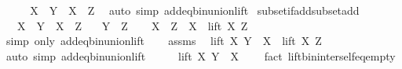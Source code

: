 \begin{isabellebody}
\ \ \isamarkupfalse%
\ \isamarkupfalse%
\ {\isachardoublequoteopen}X\ {\isacharplus}{\kern0pt}\ Y\ {\isasymsubseteq}\ X\ {\isacharplus}{\kern0pt}\ Z{\isachardoublequoteclose}\ \isamarkupfalse%
\ {\isacharparenleft}{\kern0pt}auto\ simp{\isacharcolon}{\kern0pt}\ add{\isacharunderscore}{\kern0pt}eq{\isacharunderscore}{\kern0pt}bin{\isacharunderscore}{\kern0pt}union{\isacharunderscore}{\kern0pt}lift{\isacharparenright}{\kern0pt}\isanewline
{}\isamarkupfalse%
%
\endisatagproof
{\isafoldproof}%
%
\isadelimproof
\isanewline
%
\endisadelimproof
\isanewline
{}\isamarkupfalse%
\ subset{\isacharunderscore}{\kern0pt}if{\isacharunderscore}{\kern0pt}add{\isacharunderscore}{\kern0pt}subset{\isacharunderscore}{\kern0pt}add{\isacharcolon}{\kern0pt}\isanewline
\ \ \ {\isachardoublequoteopen}X\ {\isacharplus}{\kern0pt}\ Y\ {\isasymsubseteq}\ X\ {\isacharplus}{\kern0pt}\ Z{\isachardoublequoteclose}\isanewline
\ \ \ {\isachardoublequoteopen}Y\ {\isasymsubseteq}\ Z{\isachardoublequoteclose}\isanewline
%
\isadelimproof
%
\endisadelimproof
%
\isatagproof
{}\isamarkupfalse%
{\isacharminus}{\kern0pt}\isanewline
\ \ \isamarkupfalse%
\ {\isachardoublequoteopen}X\ {\isacharplus}{\kern0pt}\ Z\ {\isacharequal}{\kern0pt}\ X\ {\isasymunion}\ lift\ X\ Z{\isachardoublequoteclose}\ \isamarkupfalse%
\ {\isacharparenleft}{\kern0pt}simp\ only{\isacharcolon}{\kern0pt}\ add{\isacharunderscore}{\kern0pt}eq{\isacharunderscore}{\kern0pt}bin{\isacharunderscore}{\kern0pt}union{\isacharunderscore}{\kern0pt}lift{\isacharparenright}{\kern0pt}\isanewline
\ \ \isamarkupfalse%
\ assms\ \isamarkupfalse%
\ {\isachardoublequoteopen}lift\ X\ Y\ {\isasymsubseteq}\ X\ {\isasymunion}\ lift\ X\ Z{\isachardoublequoteclose}\ \isamarkupfalse%
\ {\isacharparenleft}{\kern0pt}auto\ simp{\isacharcolon}{\kern0pt}\ add{\isacharunderscore}{\kern0pt}eq{\isacharunderscore}{\kern0pt}bin{\isacharunderscore}{\kern0pt}union{\isacharunderscore}{\kern0pt}lift{\isacharparenright}{\kern0pt}\isanewline
\ \ \isamarkupfalse%
\ \isamarkupfalse%
\ {\isachardoublequoteopen}lift\ X\ Y\ {\isasyminter}\ X\ {\isacharequal}{\kern0pt}\ {\isacharbraceleft}{\kern0pt}{\isacharbraceright}{\kern0pt}{\isachardoublequoteclose}\ \isamarkupfalse%
\ {\isacharparenleft}{\kern0pt}fact\ lift{\isacharunderscore}{\kern0pt}bin{\isacharunderscore}{\kern0pt}inter{\isacharunderscore}{\kern0pt}self{\isacharunderscore}{\kern0pt}eq{\isacharunderscore}{\kern0pt}empty{\isacharparenright}{\kern0pt}\isanewline

\end{isabellebody}
